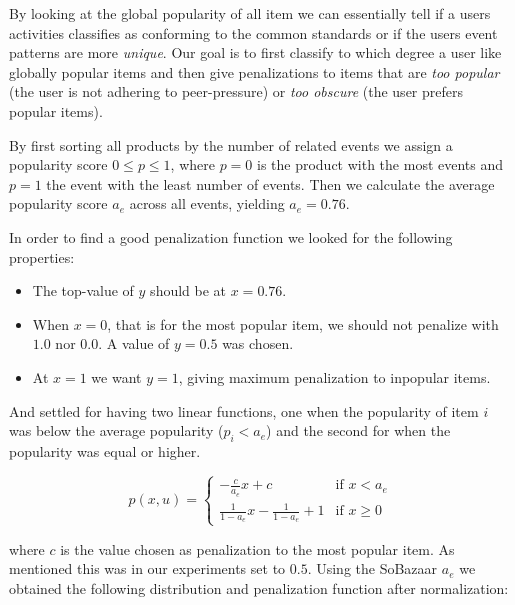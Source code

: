 By looking at the global popularity of all item we can essentially tell if a
users activities classifies as conforming to the common standards or if the
users event patterns are more \textit{unique}. Our goal is to first classify to
which degree a user like globally popular items and then give penalizations to
items that are \textit{too popular} (the user is not adhering to peer-pressure)
or \textit{too obscure} (the user prefers popular items).

By first sorting all products by the number of related events we assign
a popularity score $0 \leq p \leq 1$, where $p=0$ is the product with the most
events and $p=1$ the event with the least number of events. Then we calculate
the average popularity score $a_e$ across all events, yielding $a_e = 0.76$.

In order to find a good penalization function we looked for the following
properties:

\begin{itemize}
  \item The top-value of $y$ should be at $x = 0.76$.
  \item When $x = 0$, that is for the most popular item, we should not penalize
  with $1.0$ nor $0.0$. A value of $y = 0.5$ was chosen.
  \item At $x = 1$ we want $y = 1$, giving maximum penalization to
  inpopular items.
\end{itemize}

And settled for having two linear functions, one when the popularity of item
$i$ was below the average popularity ($p_i < a_e$) and the second for when the
popularity was equal or higher.

\begin{equation}
  p(x, u) = 
    \begin{cases}
      -\frac{c}{a_e}x + c                     & \text{if } x < a_e \\[1.5ex]
      \frac{1}{1-a_e}x - \frac{1}{1-a_e} + 1  & \text{if } x \geq 0
    \end{cases}
\end{equation}

where $c$ is the value chosen as penalization to the most popular item. As
mentioned this was in our experiments set to $0.5$. Using the SoBazaar $a_e$ we
obtained the following distribution and penalization function after
normalization:


